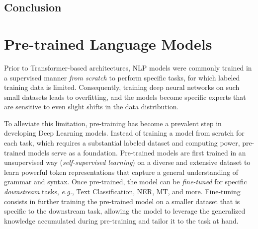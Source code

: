 
\subsection{Conclusion}


\section{Pre-trained Language Models}


Prior to Transformer-based architectures, \ac{NLP} models were commonly trained in a supervised manner \textit{from scratch} to perform specific tasks, for which labeled training data is limited. Consequently, training deep neural networks on such small datasets leads to overfitting, and the models become specific experts that are sensitive to even slight shifts in the data distribution. 


To alleviate this limitation, pre-training has become a prevalent step in developing Deep Learning models. Instead of training a model from scratch for each task, which requires a substantial labeled dataset and computing power, pre-trained models serve as a foundation. Pre-trained models are first trained in an unsupervised way (\textit{self-supervised learning}) on a diverse and extensive dataset to learn powerful token representations that capture a general understanding of grammar and syntax. Once pre-trained, the model can be \textit{fine-tuned} for specific \textit{downstream} tasks, \textit{e.g.}, Text Classification, \ac{NER}, \ac{MT}, and more. Fine-tuning consists in further training the pre-trained model on a smaller dataset that is specific to the downstream task, allowing the model to leverage the generalized knowledge accumulated during pre-training and tailor it to the task at hand.

